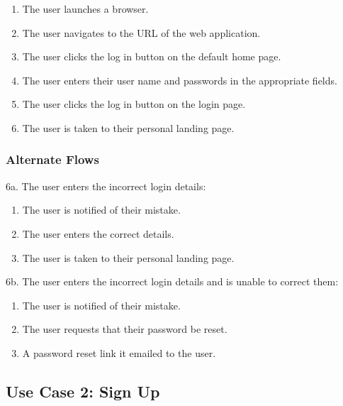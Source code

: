 \documentclass[12pt,onecolumn]{article}
\begin{document}
		\begin{enumerate}
			\item The user launches a browser.

			\item The user navigates to the URL of the web application.

			\item The user clicks the log in button on the default home page.

			\item The user enters their user name and passwords in the appropriate fields.

			\item The user clicks the log in button on the login page.

			\item The user is taken to their personal landing page.

		\end{enumerate}

		\subsubsection{Alternate Flows}

		6a. The user enters the incorrect login details:

		\begin{enumerate}
			\item The user is notified of their mistake.

			\item The user enters the correct details.

			\item The user is taken to their personal landing page.
		\end{enumerate}
		
		6b. The user enters the incorrect login details and is unable to correct them:

		\begin{enumerate}
			\item The user is notified of their mistake.

			\item The user requests that their password be reset.

			\item A password reset link it emailed to the user.
		\end{enumerate}

	\subsection{Use Case 2: Sign Up}
\end{document}
